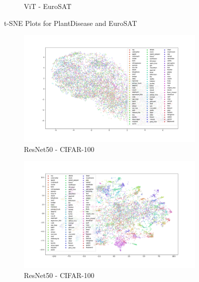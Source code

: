 \documentclass{article}
\theoremstyle{definition}
\begin{document}
\begin{figure}[h!]
\begin{subfigure}{.48\textwidth}
        \caption{ViT - EuroSAT}
    \end{subfigure}
    \caption{t-SNE Plots for PlantDisease and EuroSAT}
    \label{fig:tsne3}
\end{figure}

\begin{figure}[h!]
    \centering
    \begin{subfigure}{.65\textwidth}
        \includegraphics[width=\linewidth]{Final project/img/CIFAR100_RESNET50_train.png}
        \caption{ResNet50 - CIFAR-100}
    \end{subfigure}
    \begin{subfigure}{.65\textwidth}
        \includegraphics[width=\linewidth]{Final project/img/CIFAR100_clip-vit-base-patch32_train.png}
        \caption{ResNet50 - CIFAR-100}
    \end{subfigure}
    \begin{subfigure}{.65\textwidth}

\end{subfigure}
\end{figure}
\end{document}
